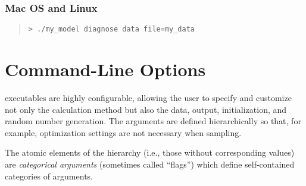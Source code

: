 \subsubsection{Mac OS and Linux}
%
\begin{quote}
\begin{Verbatim}[fontshape=sl]
> ./my_model diagnose data file=my_data
\end{Verbatim}
\end{quote}




\section{Command-Line Options}\label{stan-command-line-options.section}

\Stan executables are highly configurable, allowing the user to specify
and customize not only the calculation method but also the data, output,
initialization, and random number generation.  The arguments are defined
hierarchically so that, for example, optimization settings are not necessary
when sampling.  

The atomic elements of the hierarchy (i.e., those without
corresponding values) are \textit{categorical arguments} (sometimes
called ``flags'') which define self-contained categories of arguments.

